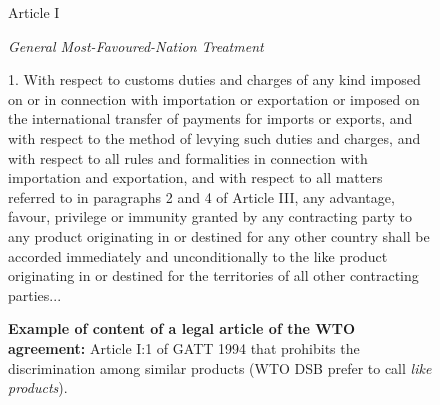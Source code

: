 \begin{figure}[h]
    \begin{center}
        Article I
    \end{center}
    \begin{center}
        \textit{General Most-Favoured-Nation Treatment}
    \end{center}
    1. With respect to customs duties and charges of any kind imposed on or in connection
    with importation or exportation or imposed on the international transfer of payments for
    imports or exports, and with respect to the method of levying such duties and charges, and
    with respect to all rules and formalities in connection with importation and exportation, and
    with respect to all matters referred to in paragraphs 2 and 4 of Article III, any advantage,
    favour, privilege or immunity granted by any contracting party to any product originating in
    or destined for any other country shall be accorded immediately and unconditionally to the
    like product originating in or destined for the territories of all other contracting parties...
    \caption{\textbf{Example of content of a legal article of the WTO agreement:} Article I:1 of GATT 1994 that prohibits the discrimination among similar products (WTO DSB prefer to call \textit{like products}).}
    \label{fig:gatt_art1}
\end{figure}






